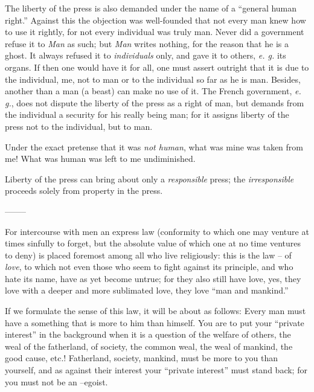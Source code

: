 \documentclass[12pt,a4paper]{book}
\begin{document}
The liberty of the press is also demanded under the name of a ``general human 
right.'' Against this the objection was well-founded that not every man knew 
how to use it rightly, for not every individual was truly man. Never did a 
government refuse it to \textit{Man} as such; but \textit{Man} writes nothing, 
for the reason that he is a ghost. It always refused it to 
\textit{individuals} only, and gave it to others, \textit{e. g.} its organs. 
If then one would have it for all, one must assert outright that it is due to 
the individual, me, not to man or to the individual so far as he is man. 
Besides, another than a man (a beast) can make no use of it. The French 
government, \textit{e. g.}, does not dispute the liberty of the press as a 
right of man, but demands from the individual a security for his really being 
man; for it assigns liberty of the press not to the individual, but to man.

Under the exact pretense that it was \textit{not human}, what was mine was 
taken from me! What was human was left to me undiminished.

Liberty of the press can bring about only a \textit{responsible} press; the 
\textit{irresponsible} proceeds solely from property in the press.

\begin{center}
--------\end{center}


For intercourse with men an express law (conformity to which one may venture 
at times sinfully to forget, but the absolute value of which one at no time 
ventures to deny) is placed foremost among all who live religiously: this is 
the law -- of \textit{love}, to which not even those who seem to fight against 
its principle, and who hate its name, have as yet become untrue; for they also 
still have love, yes, they love with a deeper and more sublimated love, they 
love ``man and mankind.''

If we formulate the sense of this law, it will be about as follows: Every man 
must have a something that is more to him than himself. You are to put your 
``private interest'' in the background when it is a question of the welfare 
of others, the weal of the fatherland, of society, the common weal, the weal 
of mankind, the good cause, etc.! Fatherland, society, mankind, must be more 
to you than yourself, and as against their interest your ``private 
interest'' must stand back; for you must not be an --egoist.
\end{document}
